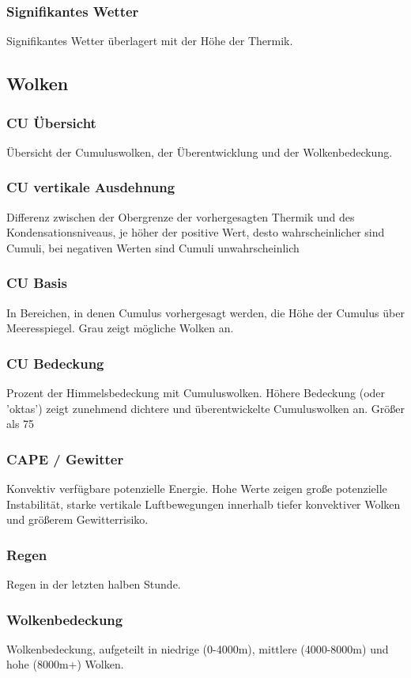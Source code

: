 \documentclass[11pt,a4paper]{article}
\begin{document}
\subsubsection{Signifikantes Wetter}
Signifikantes Wetter überlagert mit der Höhe der Thermik.


\subsection{Wolken}
\subsubsection{CU Übersicht}
Übersicht der Cumuluswolken, der Überentwicklung und der Wolkenbedeckung.  
\subsubsection{CU vertikale Ausdehnung}
Differenz zwischen der Obergrenze der vorhergesagten Thermik und des Kondensationsniveaus, je höher der positive Wert, desto wahrscheinlicher sind Cumuli, bei negativen Werten sind Cumuli unwahrscheinlich
\subsubsection{CU Basis}
In Bereichen, in denen Cumulus vorhergesagt werden, die Höhe der Cumulus über Meeresspiegel. Grau zeigt mögliche Wolken an.
\subsubsection{CU Bedeckung}
Prozent der Himmelsbedeckung mit Cumuluswolken. Höhere Bedeckung (oder 'oktas') zeigt zunehmend dichtere und überentwickelte Cumuluswolken an. Größer als 75%
\subsubsection{CAPE / Gewitter}
Konvektiv verfügbare potenzielle Energie. Hohe Werte zeigen große potenzielle Instabilität, starke vertikale Luftbewegungen innerhalb tiefer konvektiver Wolken und größerem Gewitterrisiko.
\subsubsection{Regen}
Regen in der letzten halben Stunde.
\subsubsection{Wolkenbedeckung}
Wolkenbedeckung, aufgeteilt in niedrige (0-4000m), mittlere (4000-8000m) und hohe (8000m+) Wolken.
\end{document}
